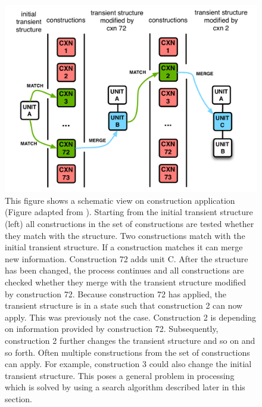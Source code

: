 \begin{figure}
\begin{center}
\includegraphics[width=0.8\columnwidth]{figs/high-level-cxn-application}
\end{center}
\caption[Construction application]{This figure shows a schematic view on 
construction application (Figure adapted from \citealp{steels2011design}).
Starting from the initial transient structure (left)
all constructions in the set of constructions are tested whether they 
match with the structure. Two constructions match with the
initial transient structure. If a construction matches it 
can merge new information. Construction 72 adds 
unit C. After the structure has been changed, the process continues
and all constructions are checked whether they merge with
the transient structure modified by construction 72.
Because construction 72 has applied, the transient
structure is in a state such that construction 2 can now apply. 
This was previously not the case. Construction 2 is depending on
information provided by construction 72. Subsequently, construction 2 
further changes the transient structure and so on and so forth.
Often multiple constructions from the set of constructions can apply.
For example, construction 3 could also change the initial transient structure.
This poses a general problem in processing which is solved
by using a search algorithm described later in this section.}
\label{f:cxn-application}
\end{figure}
